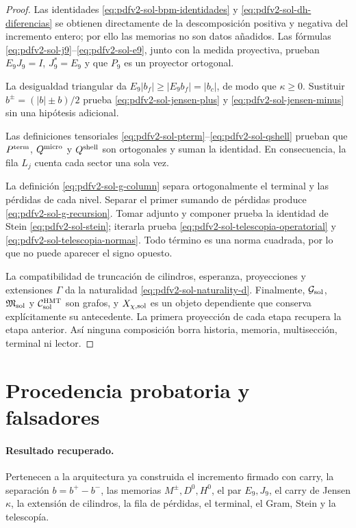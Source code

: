 \begin{proof}
Las identidades \eqref{eq:pdfv2-sol-bpm-identidades} y
\eqref{eq:pdfv2-sol-dh-diferencias} se obtienen directamente de la
descomposición positiva y negativa del incremento entero; por ello las
memorias no son datos añadidos.  Las fórmulas
\eqref{eq:pdfv2-sol-j9}--\eqref{eq:pdfv2-sol-e9}, junto con la medida
proyectiva, prueban \(E_9J_9=I\), \(J_9^*=E_9\) y que \(P_9\) es un
proyector ortogonal.

La desigualdad triangular da
\(E_9|b_f|\geq|E_9b_f|=|b_c|\), de modo que
\(\kappa\geq0\).  Sustituir
\(b^\pm=(|b|\pm b)/2\) prueba
\eqref{eq:pdfv2-sol-jensen-plus} y
\eqref{eq:pdfv2-sol-jensen-minus} sin una hipótesis adicional.

Las definiciones tensoriales
\eqref{eq:pdfv2-sol-pterm}--\eqref{eq:pdfv2-sol-qshell} prueban que
\(P^{\rm term}\), \(Q^{\rm micro}\) y \(Q^{\rm shell}\) son ortogonales y
suman la identidad.  En consecuencia, la fila \(L_j\) cuenta cada sector una
sola vez.

La definición \eqref{eq:pdfv2-sol-g-column} separa ortogonalmente el terminal
y las pérdidas de cada nivel.  Separar el primer sumando de pérdidas produce
\eqref{eq:pdfv2-sol-g-recursion}.  Tomar adjunto y componer prueba la identidad
de Stein \eqref{eq:pdfv2-sol-stein}; iterarla prueba
\eqref{eq:pdfv2-sol-telescopia-operatorial} y
\eqref{eq:pdfv2-sol-telescopia-normas}.  Todo término es una norma cuadrada,
por lo que no puede aparecer el signo opuesto.

La compatibilidad de truncación de cilindros, esperanza, proyecciones y
extensiones \(\Gamma\) da la naturalidad
\eqref{eq:pdfv2-sol-naturality-d}.  Finalmente,
\(\mathcal G_{\rm sol}\), \(\mathfrak M_{\rm sol}\) y
\(\mathcal C_{\rm sol}^{\rm HMT}\) son grafos, y
\(X_{\chi,{\rm sol}}\) es un objeto dependiente que conserva explícitamente
su antecedente.  La primera proyección de cada etapa recupera la etapa
anterior.  Así ninguna composición borra historia, memoria, multisección,
terminal ni lector.
\end{proof}

\section{Procedencia probatoria y falsadores}
\label{sec:pdfv2-sol-provenance-falsifiers}

\paragraph{Resultado recuperado.}
Pertenecen a la arquitectura ya construida el incremento firmado con carry,
la separación \(b=b^+-b^-\), las memorias \(M^\pm,D^0,H^0\), el par
\(E_9,J_9\), el carry de Jensen \(\kappa\), la extensión de cilindros, la
fila de pérdidas, el terminal, el Gram, Stein y la telescopía.

